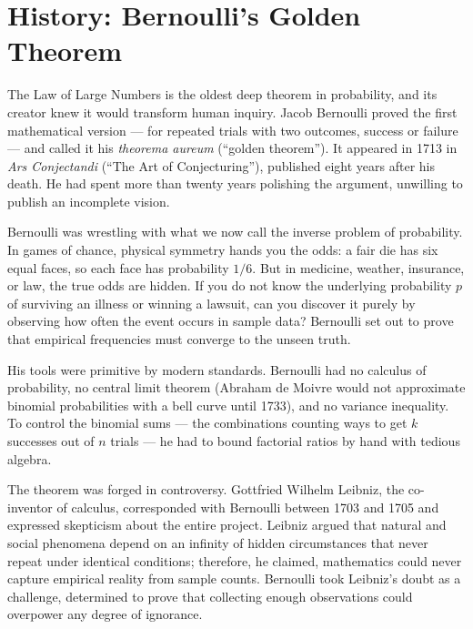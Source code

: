 \section{History: Bernoulli's Golden Theorem}
\label{ch20:history}

\begin{historybox}
The Law of Large Numbers is the oldest deep theorem in probability, and its creator knew it would transform human inquiry. Jacob Bernoulli proved the first mathematical version --- for repeated trials with two outcomes, success or failure --- and called it his \emph{theorema aureum} (``golden theorem''). It appeared in 1713 in \emph{Ars Conjectandi} (``The Art of Conjecturing''), published eight years after his death. He had spent more than twenty years polishing the argument, unwilling to publish an incomplete vision.

Bernoulli was wrestling with what we now call the inverse problem of probability. In games of chance, physical symmetry hands you the odds: a fair die has six equal faces, so each face has probability $1/6$. But in medicine, weather, insurance, or law, the true odds are hidden. If you do not know the underlying probability $p$ of surviving an illness or winning a lawsuit, can you discover it purely by observing how often the event occurs in sample data? Bernoulli set out to prove that empirical frequencies must converge to the unseen truth.

His tools were primitive by modern standards. Bernoulli had no calculus of probability, no central limit theorem (Abraham de Moivre would not approximate binomial probabilities with a bell curve until 1733), and no variance inequality. To control the binomial sums --- the combinations counting ways to get $k$ successes out of $n$ trials --- he had to bound factorial ratios by hand with tedious algebra.

The theorem was forged in controversy. Gottfried Wilhelm Leibniz, the co-inventor of calculus, corresponded with
Bernoulli between 1703 and 1705 and expressed skepticism about the entire
project. Leibniz argued that natural and social phenomena depend on an infinity
of hidden circumstances that never repeat under identical conditions; therefore,
he claimed, mathematics could never capture empirical reality from sample counts. Bernoulli took Leibniz's doubt as a challenge, determined to prove that collecting enough observations could overpower any degree of ignorance.


\end{historybox}
